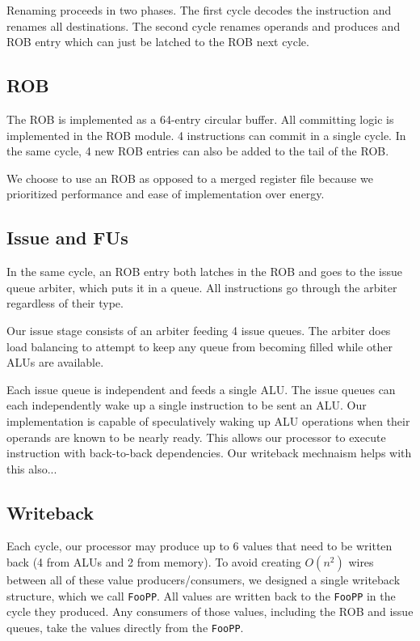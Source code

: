 \documentclass{article}
\begin{document}
Renaming proceeds in two phases. The first cycle decodes the instruction and
renames all destinations. The second cycle renames operands and produces and ROB
entry which can just be latched to the ROB next cycle.

\subsection{ROB}

The ROB is implemented as a 64-entry circular buffer. All committing logic is
implemented in the ROB module. 4 instructions can commit in a single cycle. In
the same cycle, 4 new ROB entries can also be added to the tail of the ROB.

We choose to use an ROB as opposed to a merged register file because we
prioritized performance and ease of implementation over energy.

\subsection{Issue and FUs}

In the same cycle, an ROB entry both latches in the ROB and goes to the issue
queue arbiter, which puts it in a queue. All instructions go through the arbiter
regardless of their type.

Our issue stage consists of an arbiter feeding 4 issue queues.
The arbiter does load balancing to attempt to keep any queue from becoming
filled while other ALUs are available.

Each issue queue is independent and feeds a single ALU. The issue queues can
each independently wake up a single instruction to be sent an ALU. Our
implementation is capable of speculatively waking up ALU operations when their
operands are known to be nearly ready. This allows our processor to execute
instruction with back-to-back dependencies. Our writeback mechnaism helps with
this also...

\subsection{Writeback}

Each cycle, our processor may produce up to 6 values that need to be written
back (4 from ALUs and 2 from memory). To avoid creating $O(n^2)$ wires between
all of these value producers/consumers, we designed a single writeback
structure, which we call \texttt{FooPP}. All values are written back to the
\texttt{FooPP} in the cycle they produced. Any consumers of those values,
including the ROB and issue queues, take the values directly from the
\texttt{FooPP}.
\end{document}
